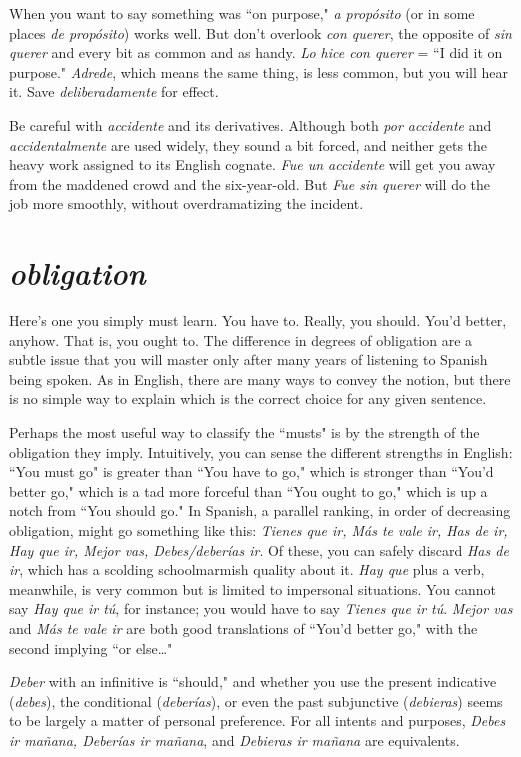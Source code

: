 When you want to say something was ``on purpose,"
\emph{a propósito} (or in some places \emph{de propósito}) works well. But don't overlook
\emph{con querer}, the opposite of \emph{sin querer} and every bit as common and
as handy. \emph{Lo hice con querer} = ``I did it on purpose." \emph{Adrede}, which
means the same thing, is less common, but you will hear it. Save \emph{deliberadamente} for effect.

Be careful with \emph{accidente} and its derivatives. Although both
\emph{por accidente} and \emph{accidentalmente} are used widely, they sound a bit
forced, and neither gets the heavy work assigned to its English cognate.
\emph{Fue un accidente} will get you away from the maddened crowd and the
six-year-old. But \emph{Fue sin querer} will do the job more smoothly, without overdramatizing the incident.

\section{\emph{obligation}}

Here's one you simply must learn. You have to. Really, you
should. You'd better, anyhow. That is, you ought to.
The difference in degrees of obligation are a subtle issue that
you will master only after many years of listening to Spanish being
spoken. As in English, there are many ways to convey the notion, but
there is no simple way to explain which is the correct choice for any
given sentence.

Perhaps the most useful way to classify the ``musts" is by the
strength of the obligation they imply. Intuitively, you can sense the
different strengths in English: ``You must go" is greater than ``You have
to go," which is stronger than ``You'd better go," which is a tad more
forceful than ``You ought to go," which is up a notch from ``You should
go." In Spanish, a parallel ranking, in order of decreasing obligation,
might go something like this: \emph{Tienes que ir, Más te vale ir, Has de ir,
Hay que ir, Mejor vas, Debes/deberías ir}. Of these, you can safely discard \emph{Has de ir}, which has a scolding schoolmarmish quality about it.
\emph{Hay que} plus a verb, meanwhile, is very common but is limited to impersonal situations. You cannot say \emph{Hay que ir tú}, for instance; you
would have to say \emph{Tienes que ir tú}. \emph{Mejor vas} and \emph{Más te vale ir} are
both good translations of ``You'd better go," with the second implying
``or else\ldots{}"

\emph{Deber} with an infinitive is ``should," and whether you use the
present indicative (\emph{debes}), the conditional (\emph{deberías}), or even the past
subjunctive (\emph{debieras}) seems to be largely a matter of personal preference. For all intents and purposes, \emph{Debes ir mañana, Deberías ir mañana}, and \emph{Debieras ir mañana} are equivalents.

